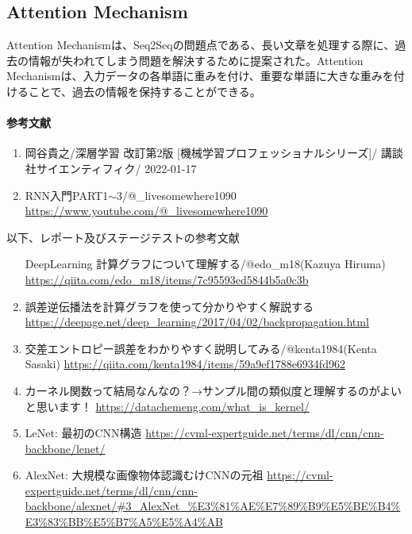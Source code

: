 \documentclass{ltjsarticle}
\begin{document}
\subsection{Attention Mechanism}
Attention Mechanismは、Seq2Seqの問題点である、長い文章を処理する際に、過去の情報が失われてしまう問題を解決するために提案された。Attention Mechanismは、入力データの各単語に重みを付け、重要な単語に大きな重みを付けることで、過去の情報を保持することができる。


\paragraph{参考文献}
\begin{enumerate}
  \item 岡谷貴之/深層学習 改訂第2版 [機械学習プロフェッショナルシリーズ]/ 講談社サイエンティフィク/ 2022-01-17
  \item RNN入門PART1$\sim$3/@\_livesomewhere1090 \url{https://www.youtube.com/@\_livesomewhere1090}
\end{enumerate}

以下、レポート及びステージテストの参考文献
\begin{enumerate}
  \item [DeepLearning] 計算グラフについて理解する/@edo\_m18(Kazuya Hiruma) \url{https://qiita.com/edo_m18/items/7c95593ed5844b5a0c3b}
  \item 誤差逆伝播法を計算グラフを使って分かりやすく解説する \url{https://deepage.net/deep\_learning/2017/04/02/backpropagation.html}
  \item 交差エントロピー誤差をわかりやすく説明してみる/@kenta1984(Kenta Sasaki) \url{https://qiita.com/kenta1984/items/59a9ef1788e6934fd962}
  \item カーネル関数って結局なんなの？→サンプル間の類似度と理解するのがよいと思います！ \url{https://datachemeng.com/what_is_kernel/}
  \item LeNet: 最初のCNN構造 \url{https://cvml-expertguide.net/terms/dl/cnn/cnn-backbone/lenet/}
  \item AlexNet: 大規模な画像物体認識むけCNNの元祖 \url{https://cvml-expertguide.net/terms/dl/cnn/cnn-backbone/alexnet/#3_AlexNet_\%E3\%81\%AE\%E7\%89\%B9\%E5\%BE\%B4\%E3\%83\%BB\%E5\%B7\%A5\%E5\%A4\%AB}
\end{enumerate}

\newpage
\end{document}
